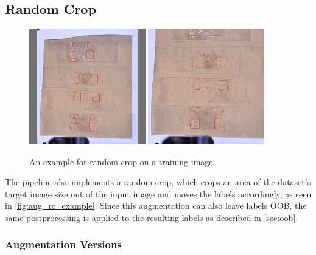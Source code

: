\documentclass[10pt]{book}
\newcommand{\figureref}[1]{\autoref{#1}}
\begin{document}
\subsection{Random Crop}

\begin{figure}
  \centering
     {\includegraphics[width=0.45\textwidth]{image/aug_rc_before}}
     {\includegraphics[width=0.45\textwidth]{image/aug_rc_after}}
  \caption{An example for random crop on a training image.}
  \label{fig:aug_rc_example}
\end{figure}

The pipeline also implements a random crop, which crops an area of the dataset's target image size out of the input image and moves the labels accordingly, as seen in \figureref{fig:aug_rc_example}. Since this augmentation can also leave labels \ac{OOB}, the same postprocessing is applied to the resulting labels as described in \autoref{sec:oob}.

\subsubsection{Augmentation Versions}
\end{document}

